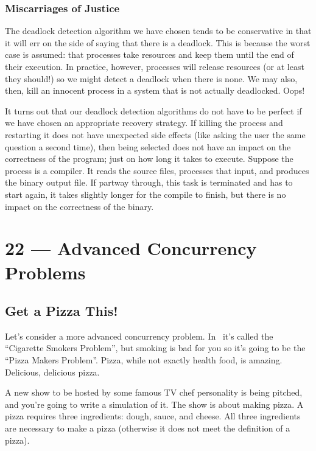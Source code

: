\documentclass[a4paper]{report}
\begin{document}
\subsection*{Miscarriages of Justice}
The deadlock detection algorithm we have chosen tends to be conservative in that it will err on the side of saying that there is a deadlock. This is because the worst case is assumed: that processes take resources and keep them until the end of their execution. In practice, however, processes will release resources (or at least they should!) so we might detect a deadlock when there is none. We may also, then, kill an innocent process in a system that is not actually deadlocked. Oops!

It turns out that our deadlock detection algorithms do not have to be perfect if we have chosen an appropriate recovery strategy. If killing the process and restarting it does not have unexpected side effects (like asking the user the same question a second time), then being selected does not have an impact on the correctness of the program; just on how long it takes to execute. Suppose the process is a compiler. It reads the source files, processes that input, and produces the binary output file. If partway through, this task is terminated and has to start again, it takes slightly longer for the compile to finish, but there is no impact on the correctness of the binary.









\chapter*{22 --- Advanced Concurrency Problems}


\section*{Get a Pizza This!}
Let's consider a more advanced concurrency problem. In~\cite{lbs} it's called the ``Cigarette Smokers Problem'', but smoking is bad for you so it's going to be the ``Pizza Makers Problem''. Pizza, while not exactly health food, is amazing. Delicious, delicious pizza.

A new show to be hosted by some famous TV chef personality is being pitched, and you're going to write a simulation of it. The show is about making pizza. A pizza requires three ingredients: dough, sauce, and cheese. All three ingredients are necessary to make a pizza (otherwise it does not meet the definition of a pizza).
\end{document}
